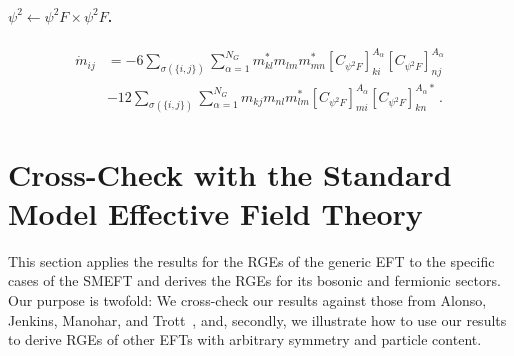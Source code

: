 \paragraph{\texorpdfstring{$\psi^2 \leftarrow \psi^2 F \times \psi^2 F$}{fmassfrompsi2F}.}

\begin{align}
    \dot m_{ij} &= -6\sum_{\sigma(\{i,j\})} \sum_{\alpha=1}^{N_G} m_{kl}^{*} m_{lm}^{\phantom *} m^*_{mn} \left[C_{\psi^2 F}\right]_{ki}^{A_\alpha}\left[C_{\psi^2 F}\right]_{nj}^{A_\alpha} \nonumber \\
    &-12 \sum_{\sigma(\{i,j\})} \sum_{\alpha=1}^{N_G} m_{kj} m_{nl}m^*_{lm}\left[C_{\psi^2 F}\right]^{A_\alpha}_{mi}\left[C_{\psi^2 F}\right]^{A_\alpha *}_{kn}\,. 
\end{align}



\section{Cross-Check with the Standard Model Effective Field Theory}
\label{sec:gEFTSMEFT}

This section applies the results for the RGEs of the generic EFT to the specific cases of 
the SMEFT and derives the RGEs for its bosonic and fermionic sectors.
Our purpose is twofold: We cross-check our results against those from Alonso, Jenkins, Manohar, and Trott~\cite{Jenkins:2013zja,Jenkins:2013wua,Alonso:2013hga}, and, secondly, we illustrate how to use our results to derive RGEs of other EFTs with arbitrary symmetry and particle content. 

